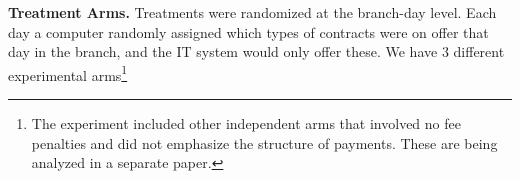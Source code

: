 \documentclass[11pt, a4paper]{article}
\begin{document}

\vspace{.2in}
\noindent \textbf{Treatment Arms.} Treatments were randomized at the branch-day level. Each day a computer randomly assigned which types of contracts were on offer that day in the branch, and the IT system would only offer these.  We have 3 different experimental arms\footnote{The experiment included other independent arms that involved no fee penalties and did not emphasize the structure of payments. These are being analyzed in a separate paper.} 
\end{document}
